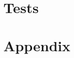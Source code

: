 \documentclass[titlepage, twocolumn, a4paper, 10pt]{article}
\begin{document}
\section{Tests}\label{sec:tests}






\newpage
\appendix
{}
\section{Appendix}\label{sec:kallkod}
\end{document}
